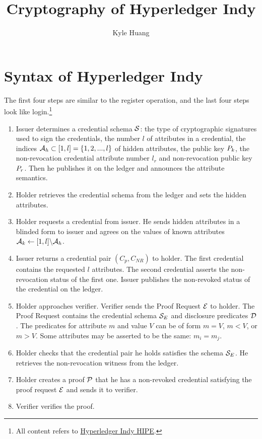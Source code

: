 \documentclass{article}
\begin{document}
\title{Cryptography of Hyperledger Indy}
\author{Kyle Huang}
\maketitle

\section{Syntax of Hyperledger Indy}
The first four steps are similar to the register operation, and the last four steps look like login.\footnote{All content refers to \href{https://hyperledger-indy.readthedocs.io/projects/hipe/en/latest/text/0109-anoncreds-protocol/README.html}{Hyperledger Indy HIPE}.}
\begin{enumerate}
\item Issuer determines a credential schema $\mathcal{S}$: the type of cryptographic signatures used to sign the credentials, the number $l$ of attributes in a credential, the indices $\mathcal{A}_{h} \subset [{1, {l}}] = \{1, 2, ..., l\}$ of hidden attributes, the public key $P_{k} $, the non-revocation credential attribute number $l_{r}$ and non-revocation public key $P_{r} $. Then he publishes it on the ledger and announces the attribute semantics.
\item Holder retrieves the credential schema from the ledger and sets the hidden attributes.
\item Holder requests a credential from issuer. He sends hidden attributes in a blinded form to issuer and agrees on the values of known attributes $\mathcal{A}_{k} \leftarrow [{1, {l}}] \backslash \mathcal{A}_{h} $.
\item Issuer returns a credential pair $(C_{p}, C_{NR})$ to holder. The first credential contains the requested $l$ attributes. The second credential asserts the non-revocation status of the first one. Issuer publishes the non-revoked status of the credential on the ledger.
\item Holder approaches verifier. Verifier sends the Proof Request $\mathcal{E}$ to holder. The Proof Request contains the credential schema $\mathcal{S}_{E}$ and disclosure predicates $\mathcal{D}$. The predicates for attribute $m$ and value $V$ can be of form $m=V$, $m<V$, or $m>V$. Some attributes may be asserted to be the same: $m_{i}=m_{j}$.
\item Holder checks that the credential pair he holds satisfies the schema $\mathcal{S}_{E}$. He retrieves the non-revocation witness from the ledger.
\item Holder creates a proof $\mathcal{P}$ that he has a non-revoked credential satisfying the proof request $\mathcal{E}$ and sends it to verifier.
\item Verifier verifies the proof.
\end{enumerate}
\end{document}
